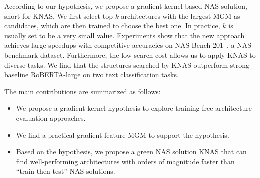 According to our hypothesis, we propose a gradient kernel based NAS solution, short for KNAS. We first select top-$k$ architectures with the largest MGM as candidates, which are then trained to choose the best one. In practice, $k$ is usually set to be a very small value. Experiments show that the new approach achieves large speedups with competitive accuracies on NAS-Bench-201~\citep{DBLP:conf/iclr/Dong020}, a NAS benchmark dataset. Furthermore, the low search cost allows us to apply KNAS to diverse tasks. We find that the structures searched by KNAS outperform strong baseline RoBERTA-large on two text classification tasks.  
























The main contributions are summarized as follows:
\begin{itemize}

\item We propose a gradient kernel hypothesis to explore training-free architecture evaluation approaches. 


\item We find a practical gradient feature MGM to support the hypothesis.


\item Based on the hypothesis, we propose a green NAS solution KNAS that can find well-performing architectures with orders of magnitude faster than ``train-then-test'' NAS solutions. 
\end{itemize}


